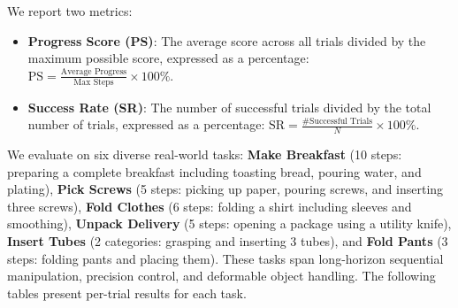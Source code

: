 \documentclass[onecolumn]{robbyant}           %
\begin{document}
We report two metrics:
\begin{itemize}
    \item \textbf{Progress Score (PS)}: The average score across all trials divided by the maximum possible score, expressed as a percentage: $\text{PS} = \frac{\text{Average Progress}}{\text{Max Steps}} \times 100\%$.
    \item \textbf{Success Rate (SR)}: The number of successful trials divided by the total number of trials, expressed as a percentage: $\text{SR} = \frac{\text{\# Successful Trials}}{N} \times 100\%$.
\end{itemize}

We evaluate on six diverse real-world tasks: \textbf{Make Breakfast} (10 steps: preparing a complete breakfast including toasting bread, pouring water, and plating), \textbf{Pick Screws} (5 steps: picking up paper, pouring screws, and inserting three screws), \textbf{Fold Clothes} (6 steps: folding a shirt including sleeves and smoothing), \textbf{Unpack Delivery} (5 steps: opening a package using a utility knife), \textbf{Insert Tubes} (2 categories: grasping and inserting 3 tubes), and \textbf{Fold Pants} (3 steps: folding pants and placing them). These tasks span long-horizon sequential manipulation, precision control, and deformable object handling. The following tables present per-trial results for each task.
\end{document}
